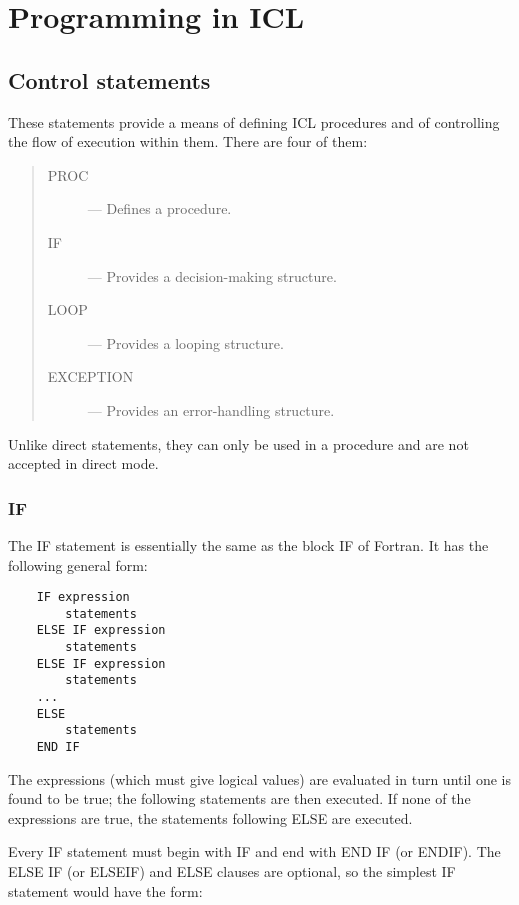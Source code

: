 \chapter{Programming in ICL}
\label{C_iclprog}

\section{Control statements}
\label{S_cs}

These statements provide a means of defining ICL procedures and of controlling
the flow of execution within them.
There are four of them:
\begin{quote}
\begin{description}
\item [PROC] --- Defines a procedure.
\item [IF] --- Provides a decision-making structure.
\item [LOOP] --- Provides a looping structure.
\item [EXCEPTION] --- Provides an error-handling structure.
\end{description}
\end{quote}
Unlike direct statements, they can only be used in a procedure and are not
accepted in direct mode.

\subsection{IF}

The IF statement is essentially the same as the block IF of Fortran.
It has the following general form:

\begin{small}
\begin{verbatim}
    IF expression
        statements
    ELSE IF expression
        statements
    ELSE IF expression
        statements
    ...
    ELSE
        statements
    END IF
\end{verbatim}
\end{small}

The expressions (which must give logical values) are evaluated in turn until
one is found to be true; the following statements are then executed.
If none of the expressions are true, the statements following ELSE are executed.

Every IF statement must begin with IF and end with END IF (or ENDIF).
The ELSE IF (or ELSEIF) and ELSE clauses are optional, so the simplest IF
statement would have the form:

